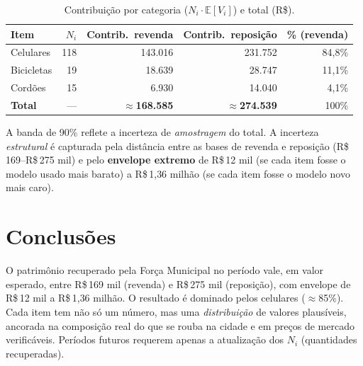\documentclass[11pt,a4paper]{article}
\newcommand{\reais}[1]{R\$\,#1}
\begin{document}
\begin{table}[H]
  \centering\small
  \begin{tabular}{lrrrr}
    \toprule
    Item & $N_i$ & Contrib.\ revenda & Contrib.\ reposição & \% (revenda) \\
    \midrule
    Celulares  & 118 & 143.016 & 231.752 & 84,8\% \\
    Bicicletas & 19  & 18.639  & 28.747  & 11,1\% \\
    Cordões    & 15  & 6.930   & 14.040  & 4,1\% \\
    \midrule
    \textbf{Total} & — & \textbf{$\approx$168.585} & \textbf{$\approx$274.539} & 100\% \\
    \bottomrule
  \end{tabular}
  \caption{Contribuição por categoria ($N_i\cdot\mathbb{E}[V_i]$) e total (R\$).}
  \label{tab:contrib}
\end{table}

\noindent A banda de 90\% reflete a incerteza de \emph{amostragem} do total. A incerteza
\emph{estrutural} é capturada pela distância entre as bases de revenda e reposição
(\reais{169}--\reais{275} mil) e pelo \textbf{envelope extremo} de \reais{12} mil (se cada item
fosse o modelo usado mais barato) a \reais{1{,}36} milhão (se cada item fosse o modelo novo mais
caro).

\section{Conclusões}
O patrimônio recuperado pela Força Municipal no período vale, em valor esperado, entre \reais{169}
mil (revenda) e \reais{275} mil (reposição), com envelope de \reais{12} mil a \reais{1{,}36}
milhão. O resultado é dominado pelos celulares ($\approx$85\%). Cada item tem não só um número, mas
uma \emph{distribuição} de valores plausíveis, ancorada na composição real do que se rouba na cidade
e em preços de mercado verificáveis. Períodos futuros requerem apenas a atualização dos $N_i$
(quantidades recuperadas).

\end{document}
